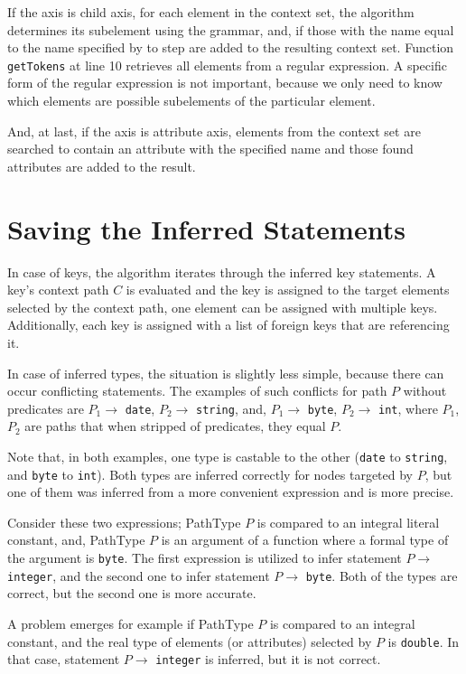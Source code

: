 If the axis is child axis, for each element in the context set, the algorithm determines its subelement using the grammar, and, if those with the name equal to the name specified by to step are added to the resulting context set. Function \texttt{getTokens} at line 10 retrieves all elements from a regular expression. A specific form of the regular expression is not important, because we only need to know which elements are possible subelements of the particular element.

And, at last, if the axis is attribute axis, elements from the context set are searched to contain an attribute with the specified name and those found attributes are added to the result.

\section{Saving the Inferred Statements}
In case of keys, the algorithm iterates through the inferred key statements. A key's context path $C$ is evaluated and the key is assigned to the target elements selected by the context path, one element can be assigned with multiple keys. Additionally, each key is assigned with a list of foreign keys that are referencing it.

In case of inferred types, the situation is slightly less simple, because there can occur conflicting statements. The examples of such conflicts for path $P$ without predicates are $P_1 \rightarrow$ \texttt{date}, $P_2 \rightarrow$ \texttt{string}, and, $P_1 \rightarrow$ \texttt{byte}, $P_2 \rightarrow$ \texttt{int}, where $P_1$, $P_2$ are paths that when stripped of predicates, they equal $P$.

Note that, in both examples, one type is castable to the other (\texttt{date} to \texttt{string}, and \texttt{byte} to \texttt{int}). Both types are inferred correctly for nodes targeted by $P$, but one of them was inferred from a more convenient expression and is more precise.

Consider these two expressions; PathType $P$ is compared to an integral literal constant, and, PathType $P$ is an argument of a function where a formal type of the argument is \texttt{byte}. The first expression is utilized to infer statement $P \rightarrow$ \texttt{integer}, and the second one to infer statement $P \rightarrow$ \texttt{byte}. Both of the types are correct, but the second one is more accurate.

A problem emerges for example if PathType $P$ is compared to an integral constant, and the real type of elements (or attributes) selected by $P$ is \texttt{double}. In that case, statement $P \rightarrow$ \texttt{integer} is inferred, but it is not correct.

